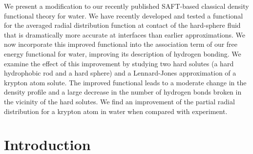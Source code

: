 \def\re{\text{Re}}
\def\im{\text{Im}}
\def\ket#1{\vert #1 \rangle}
\def\cU{{\cal{U}}}
\def\cD{{\cal{D}}}
\def\re{\text{Re}}
\def\im{\text{Im}}

\newcommand\etadisp{\ensuremath{\eta_\textit{d}}}
\newcommand\epsilondisp{\ensuremath{\epsilon_\textit{d}}}
\newcommand\epsilonassoc{\ensuremath{\epsilon_\textit{a}}}
\newcommand\kappaassoc{\ensuremath{\kappa_\textit{a}}}
\newcommand\lambdadisp{\ensuremath{\lambda_\textit{d}}}
\newcommand\lscale{\ensuremath{s_d}}

\newcommand\hughesetal{Hughes \emph{et al.}}

\newcommand\hughesetalcite{Hughes \emph{et al.}~\cite{hughes2013classical}}

We present a modification to our recently published SAFT-based classical
density functional theory for water.
%
We have recently developed and tested a functional for the averaged
radial distribution function at contact of the hard-sphere fluid
that is dramatically more accurate at interfaces than earlier
approximations.
%
We now incorporate this improved functional into the association term
of our free energy functional for water, improving its description of
hydrogen bonding.
%
We examine the effect of this improvement by studying two hard solutes
(a
hard hydrophobic rod and a hard sphere) and a Lennard-Jones
approximation of a krypton atom solute.
%
The improved functional leads to a moderate change in the density
profile and a large decrease in the number of hydrogen bonds broken in
the vicinity of the hard solutes.
%
We find an improvement of the partial radial distribution for a
krypton atom in water when compared with experiment.

\section{Introduction}

